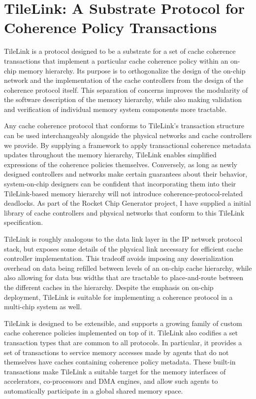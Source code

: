 \chapter{TileLink: A Substrate Protocol for Coherence Policy Transactions }
\label{c.tilelink}

TileLink is a protocol designed to be a substrate for a set of cache coherence transactions
that implement a particular cache coherence policy within an on-chip memory hierarchy.
Its purpose is to orthogonalize the design of the on-chip network and the implementation of the cache controllers from the design of the coherence protocol itself.
This separation of concerns improves the modularity of the software description of the memory hierarchy,
while also making validation and verification of individual memory system components more tractable.

Any cache coherence protocol that conforms to TileLink's transaction structure can be used interchangeably alongside the physical networks and cache controllers we provide.
By supplying a framework to apply transactional coherence metadata updates throughout the memory hierarchy, TileLink enables simplified expressions of the coherence policies themselves.
Conversely, as long as newly designed controllers and networks make certain guarantees about their behavior,
system-on-chip designers can be confident that incorporating them into their TileLink-based memory hierarchy will not introduce coherence-protocol-related deadlocks.
As part of the Rocket Chip Generator project, I have supplied a initial library of cache controllers and physical networks that conform to this TileLink specification.

TileLink is roughly analogous to the data link layer in the IP network protocol stack, but exposes some details of the physical link necessary for efficient cache controller implementation.
This tradeoff avoids imposing any deserialization overhead on data being refilled between levels of an on-chip cache hierarchy, while also allowing for data bus widths
that are tractable to place-and-route between the different caches in the hierarchy.
Despite the emphasis on on-chip deployment, TileLink is suitable for implementing a coherence protocol in a multi-chip system as well.

TileLink is designed to be extensible, and supports a growing family of custom cache coherence policies implemented on top of it.
TileLink also codifies a set transaction types that are common to all protocols.
In particular, it provides a set of transactions to service memory accesses made by agents that do not themselves have caches containing coherence policy metadata.
These built-in transactions make TileLink a suitable target for the memory interfaces of accelerators, co-processors and DMA engines,
and allow such agents to automatically participate in a global shared memory space.

